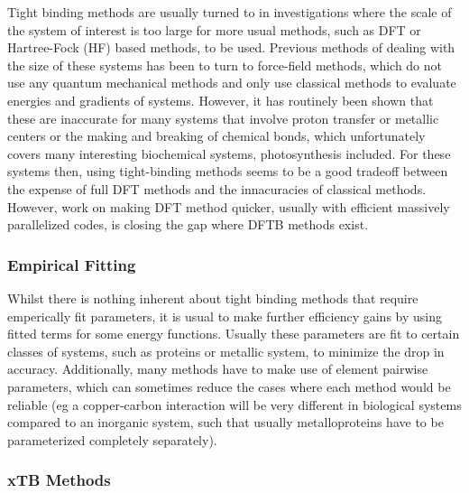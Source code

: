 Tight binding methods are usually turned to in investigations where the scale of 
the system of interest is too large for more usual methods, such as DFT or Hartree-Fock 
(HF) based methods, to be used. Previous methods of dealing with the size of these 
systems has been to turn to force-field methods, which do not use any quantum mechanical 
methods and only use classical methods to evaluate energies and gradients of systems. 
However, it has routinely been shown that these are inaccurate for many systems 
that involve proton transfer or metallic centers or the making and breaking of chemical 
bonds\cite{Salomon-Ferrer2013}, which unfortunately covers many interesting biochemical 
systems, photosynthesis included. For these systems then, using tight-binding methods 
seems to be a good tradeoff between the expense of full DFT methods and the innacuracies 
of classical methods. However, work on making DFT method quicker, usually with efficient 
massively parallelized codes, is closing the gap where DFTB methods exist\cite{Manathunga2020}.

\subsubsection{Empirical Fitting}
\label{subsubsec:empirical_fitting}

Whilst there is nothing inherent about tight binding methods that require emperically 
fit parameters, it is usual to make further efficiency gains by using fitted terms 
for some energy functions. Usually these parameters are fit to certain classes of 
systems, such as proteins or metallic system, to minimize the drop in accuracy. 
Additionally, many methods have to make use of element pairwise parameters\cite{Bannwarth2020}, 
which can sometimes reduce the cases where each method would be reliable (eg a copper-carbon 
interaction will be very different in biological systems compared to an inorganic system, 
such that usually metalloproteins have to be parameterized completely separately).

\subsubsection{xTB Methods}
\label{subsubsec:xtb_methods}

